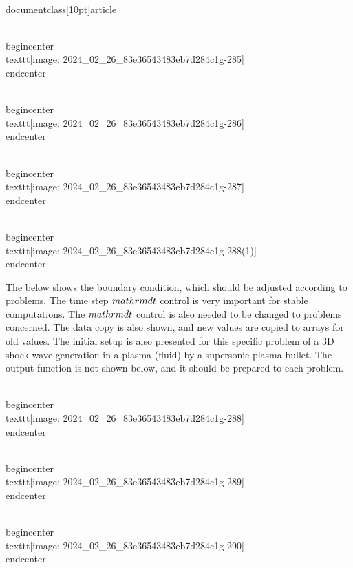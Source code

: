 \\documentclass[10pt]{article}
\begin{document}
{{{{{{\\begin{center}
\\texttt{[image: 2024\_02\_26\_83e36543483eb7d284c1g-285]}
\\end{center}

\\begin{center}
\\texttt{[image: 2024\_02\_26\_83e36543483eb7d284c1g-286]}
\\end{center}

\\begin{center}
\\texttt{[image: 2024\_02\_26\_83e36543483eb7d284c1g-287]}
\\end{center}

\\begin{center}
\\texttt{[image: 2024\_02\_26\_83e36543483eb7d284c1g-288(1)]}
\\end{center}

The below shows the boundary condition, which should be adjusted according to problems. The time step $\\mathrm{d} t$ control is very important for stable computations. The $\\mathrm{d} t$ control is also needed to be changed to problems concerned. The data copy is also shown, and new values are copied to arrays for old values. The initial setup is also presented for this specific problem of a 3D shock wave generation in a plasma (fluid) by a supersonic plasma bullet. The output function is not shown below, and it should be prepared to each problem.

\\begin{center}
\\texttt{[image: 2024\_02\_26\_83e36543483eb7d284c1g-288]}
\\end{center}

\\begin{center}
\\texttt{[image: 2024\_02\_26\_83e36543483eb7d284c1g-289]}
\\end{center}

\\begin{center}
\\texttt{[image: 2024\_02\_26\_83e36543483eb7d284c1g-290]}
\\end{center}

}}}}}}
\end{document}

